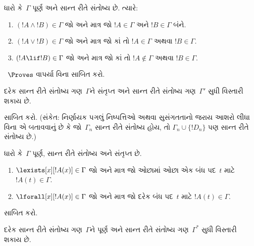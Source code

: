 \begin{prop}
ધારો કે~$\Gamma$ પૂર્ણ અને સાન્ત રીતે સંતોષ્ય છે. ત્યારે:
\begin{enumerate}
\item $(!A \land !B) \in \Gamma$ જો અને માત્ર જો
  $!A \in \Gamma$ અને $!B \in \Gamma$ બંને.

\item $(!A \lor !B) \in \Gamma$ જો અને માત્ર જો કાં તો
  $!A \in \Gamma$ અથવા $!B \in \Gamma$.

\item $(!A \lif !B) \in \Gamma$ જો અને માત્ર જો કાં તો
  $!A \notin \Gamma$ અથવા $!B \in \Gamma$.
\end{enumerate}
\end{prop}

\begin{prob}
~$\Proves$ વાપર્યા વિના 
સાબિત કરો.
\end{prob}



%
\begin{lem}
 દરેક સાન્ત રીતે સંતોષ્ય ગણ~$\Gamma$ને
સંતૃપ્ત અને સાન્ત રીતે સંતોષ્ય ગણ~$\Gamma'$ સુધી વિસ્તારી શકાય છે.
\end{lem}

\begin{prob}
 સાબિત કરો. (સંકેત: નિર્ણાયક
પગલું નિષ્પત્તિઓ અથવા સુસંગતતાનો જરાય આશરો લીધા વિના એ બતાવવાનું
છે કે જો~$\Gamma_n$ સાન્ત રીતે સંતોષ્ય હોય, તો
$\Gamma_n\cup\{!D_n\}$ પણ સાન્ત રીતે સંતોષ્ય છે.)
\end{prob}

%
\begin{prop}
ધારો કે~$\Gamma$ પૂર્ણ, સાન્ત રીતે સંતોષ્ય અને સંતૃપ્ત છે.
\begin{enumerate}
\item $\lexists[x][!A(x)]\in\Gamma$ જો અને માત્ર જો ઓછામાં
  ઓછા એક બંધ પદ~$t$ માટે $!A(t)\in\Gamma$.
\item $\lforall[x][!A(x)]\in\Gamma$ જો અને માત્ર જો દરેક
  બંધ પદ~$t$ માટે $!A(t)\in\Gamma$.
\end{enumerate}
\end{prop}

\begin{prob}
 સાબિત કરો.
\end{prob}

\begin{lem}
 દરેક સાન્ત રીતે સંતોષ્ય ગણ~$\Gamma$ને
પૂર્ણ અને સાન્ત રીતે સંતોષ્ય ગણ~$\Gamma^*$ સુધી વિસ્તારી શકાય
છે.
\end{lem}

